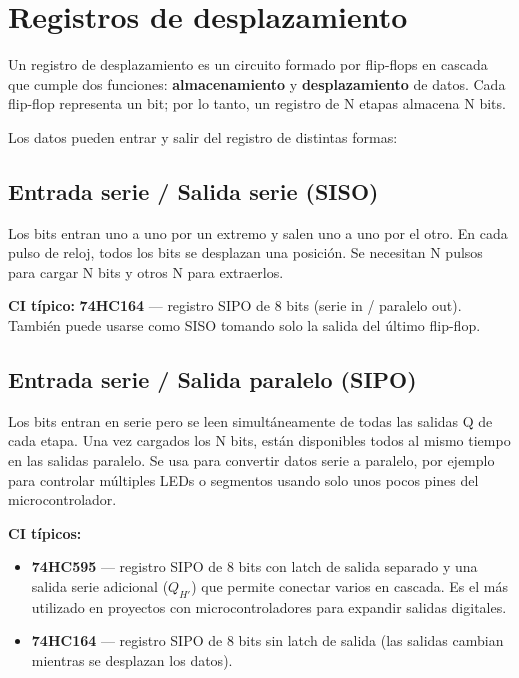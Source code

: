 \section{Registros de desplazamiento}

Un registro de desplazamiento es un circuito formado por flip-flops en cascada que cumple dos funciones: \textbf{almacenamiento} y \textbf{desplazamiento} de datos. Cada flip-flop representa un bit; por lo tanto, un registro de N etapas almacena N bits.

Los datos pueden entrar y salir del registro de distintas formas:


\subsection{Entrada serie / Salida serie (SISO)}

Los bits entran uno a uno por un extremo y salen uno a uno por el otro. En cada pulso de reloj, todos los bits se desplazan una posición. Se necesitan N pulsos para cargar N bits y otros N para extraerlos.


\begin{notabox}
\textbf{CI típico:} \textbf{74HC164} --- registro SIPO de 8 bits (serie in / paralelo out). También puede usarse como SISO tomando solo la salida del último flip-flop.
\end{notabox}

\subsection{Entrada serie / Salida paralelo (SIPO)}

Los bits entran en serie pero se leen simultáneamente de todas las salidas Q de cada etapa. Una vez cargados los N bits, están disponibles todos al mismo tiempo en las salidas paralelo. Se usa para convertir datos serie a paralelo, por ejemplo para controlar múltiples LEDs o segmentos usando solo unos pocos pines del microcontrolador.

\begin{notabox}
\textbf{CI típicos:}
\begin{itemize}
    \item \textbf{74HC595} --- registro SIPO de 8 bits con latch de salida separado y una salida serie adicional ($Q_{H'}$) que permite conectar varios en cascada. Es el más utilizado en proyectos con microcontroladores para expandir salidas digitales.
    \item \textbf{74HC164} --- registro SIPO de 8 bits sin latch de salida (las salidas cambian mientras se desplazan los datos).
\end{itemize}
\end{notabox}

